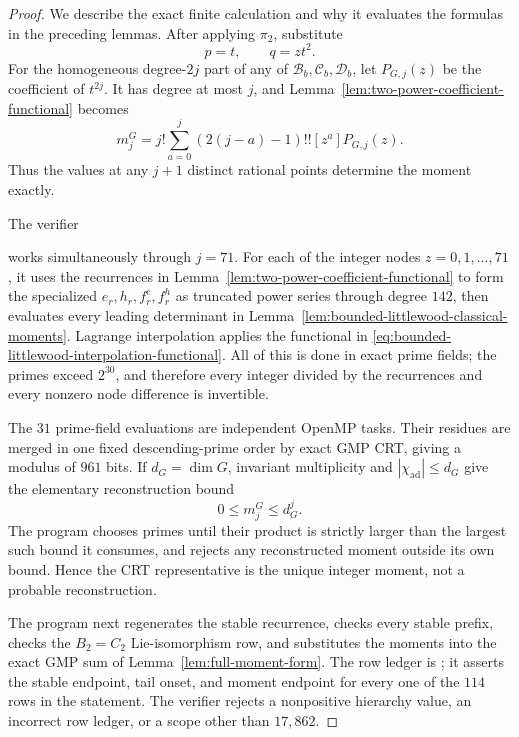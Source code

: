 \documentclass[11pt,reqno]{amsart}
\theoremstyle{plain}
\theoremstyle{definition}
\newcommand{\chiad}{\chi_{\mathrm{ad}}}
\begin{document}
\begin{proof}
We describe the exact finite calculation and why it evaluates the formulas
in the preceding lemmas.  After applying $\pi_2$, substitute
\[
 p=t,\qquad q=zt^2.
\]
For the homogeneous degree-$2j$ part of any of
$\mathcal B_b,\mathcal C_b,\mathcal D_b$, let $P_{G,j}(z)$ be the
coefficient of $t^{2j}$.  It has degree at most $j$, and
Lemma~\ref{lem:two-power-coefficient-functional} becomes
\begin{equation}
\label{eq:bounded-littlewood-interpolation-functional}
 m_j^G=j!\sum_{a=0}^{j}(2(j-a)-1)!![z^a]P_{G,j}(z).
\end{equation}
Thus the values at any $j+1$ distinct rational points determine the moment
exactly.

The verifier
\begin{center}
\end{center}
works simultaneously through $j=71$.  For each of the integer nodes
$z=0,1,\ldots,71$, it uses the recurrences in
Lemma~\ref{lem:two-power-coefficient-functional} to form the specialized
$e_r,h_r,f_r^e,f_r^h$ as truncated power series through degree $142$, then
evaluates every leading determinant in
Lemma~\ref{lem:bounded-littlewood-classical-moments}.  Lagrange interpolation
applies the functional in
\eqref{eq:bounded-littlewood-interpolation-functional}.  All of this is done
in exact prime fields; the primes exceed $2^{30}$, and therefore every
integer divided by the recurrences and every nonzero node difference is
invertible.

The $31$ prime-field evaluations are independent OpenMP tasks.  Their
residues are merged in one fixed descending-prime order by exact GMP CRT,
giving a modulus of $961$ bits.  If $d_G=\dim G$, invariant multiplicity and
$|\chiad|\leq d_G$ give the elementary reconstruction bound
\[
 0\leq m_j^G\leq d_G^j.
\]
The program chooses primes until their product is strictly larger than the
largest such bound it consumes, and rejects any reconstructed moment outside
its own bound.  Hence the CRT representative is the unique integer moment,
not a probable reconstruction.

The program next regenerates the stable recurrence, checks every stable
prefix, checks the $B_2=C_2$ Lie-isomorphism row, and substitutes the moments
into the exact GMP sum of Lemma~\ref{lem:full-moment-form}.  The row ledger is
; it asserts the
stable endpoint, tail onset, and moment endpoint for every one of the $114$
rows in the statement.  The verifier rejects a nonpositive hierarchy value,
an incorrect row ledger, or a scope other than $17{,}862$.


\end{proof}
\end{document}
